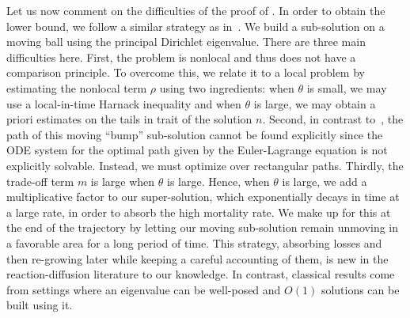 \documentclass[11pt]{article}    %
\begin{document}
Let us now comment on the difficulties of the proof of . In order to obtain the lower bound, we follow a similar strategy as in~\cite{BouinHenderson,BHR_Acceleration}.  We build a sub-solution on a moving ball using the principal Dirichlet eigenvalue.  There are three main difficulties here.  First, the problem is nonlocal and thus does not have a comparison principle.  To overcome this, we relate it to a local problem by estimating the nonlocal term $\rho$ using two ingredients: when $\theta$ is small, we may use a local-in-time Harnack inequality and when $\theta$ is large, we may obtain a priori estimates on the tails in trait of the solution $n$.  Second, in contrast to~\cite{BHR_Acceleration}, the path of this moving ``bump'' sub-solution cannot be found explicitly since the ODE system for the optimal path given by the Euler-Lagrange equation is not explicitly solvable.  Instead, we must optimize over rectangular paths.  Thirdly, the trade-off term $m$ is large when $\theta$ is large.  Hence, when $\theta$ is large, we add a multiplicative factor to our super-solution, which exponentially decays in time at a large rate, in order to absorb the high mortality rate.  We make up for this at the end of the trajectory by letting our moving sub-solution remain unmoving in a favorable area for a long period of time.  This strategy, absorbing losses and then re-growing later while keeping a careful accounting of them, is new in the reaction-diffusion literature to our knowledge.  In contrast, classical results come from settings where an eigenvalue can be well-posed and $O(1)$ solutions can be built using it.
\end{document}

